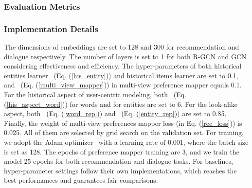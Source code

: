 \documentclass[sigconf,natbib=true]{acmart}
\begin{document}
\subsubsection{Evaluation Metrics}


\subsubsection{Implementation Details}

The dimensions of embeddings are set to 128 and 300 for recommendation and dialogue respectively. The number of layers is set to 1 for both R-GCN and GCN considering effectiveness and efficiency. The hyper-parameters of both historical entities learner ~(Eq. (\ref{his_entity})) and historical items learner  are set to 0.1, and ~(Eq. (\ref{multi_view_mapper})) in multi-view preference mapper equals 0.1. For the historical aspect of user-centric modeling, both ~(Eq. (\ref{his_aspect_word})) for words and  for entities are set to 6. For the look-alike aspect, both ~(Eq. (\ref{word_rep})) and ~(Eq. (\ref{entity_rep})) are set to 0.85. Finally, the weight of multi-view preferences mapper loss (in Eq. (\ref{rec_loss})) is 0.025. All of them are selected by grid search on the validation set. For training, we adopt the Adam optimizer~\cite{kingma2014adam} with a learning rate of 0.001, where the batch size is set as 128. The epochs of preference mapper training are 3, and we train the model 25 epochs for both recommendation and dialogue tasks. For baselines, hyper-parameter settings follow their own implementations, which reaches the best performances and guarantees fair comparisons.
\end{document}
